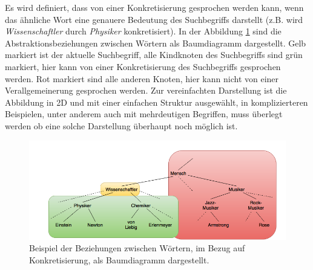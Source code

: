 \documentclass[12pt,a4paper]{report}
\begin{document}
				Es wird definiert, dass von einer Konkretisierung gesprochen werden kann, wenn das ähnliche Wort eine genauere Bedeutung des Suchbegriffs darstellt (z.B. wird \textit{Wissenschaftler} durch \textit{Physiker} konkretisiert). In der Abbildung \ref{pic:Konkretisierung} sind die Abstraktionsbeziehungen zwischen Wörtern als Baumdiagramm dargestellt. Gelb markiert ist der aktuelle Suchbegriff, alle Kindknoten des Suchbegriffs sind grün markiert, hier kann von einer Konkretisierung des Suchbegriffs gesprochen werden. Rot markiert sind alle anderen Knoten, hier kann nicht von einer Verallgemeinerung gesprochen werden. Zur vereinfachten Darstellung ist die Abbildung in 2D und mit einer einfachen Struktur ausgewählt, in komplizierteren Beispielen, unter anderem auch mit mehrdeutigen Begriffen, muss überlegt werden ob eine solche Darstellung überhaupt noch möglich ist.\\
		
\begin{figure}[h]
  \begin{center}
	\includegraphics[scale=0.55]{Konkretisierung_Baum2.png}
  \end{center}  
  \caption{Beispiel der Beziehungen zwischen Wörtern, im Bezug auf Konkretisierung, als Baumdiagramm dargestellt.}
  \label{pic:Konkretisierung}
\end{figure}
		
\end{document}

